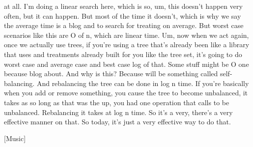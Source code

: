 at all. I'm doing a linear search here, which is so, um, this doesn't happen very often, but it can happen. But most of the time it doesn't, which is why we say the average time is a blog and to search for treating on average. But worst case scenarios like this are O of n, which are linear time. Um, now when we act again, once we actually use trees, if you're using a tree that's already been like a library that uses and treatments already built for you like the tree set, it's going to do worst case and average case and best case log of that. Some stuff might be O one because blog about. And why is this? Because will be something called self-balancing. And rebalancing the tree can be done in log n time. If you're basically when you add or remove something, you cause the tree to become unbalanced, it takes as so long as that was the up, you had one operation that calls to be unbalanced. Rebalancing it takes at log n time. So it's a very, there's a very effective manner on that. So today, it's just a very effective way to do that.

[Music]

